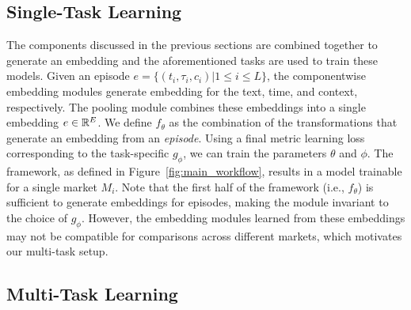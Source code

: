 \subsection{Single-Task Learning}
The components discussed in the previous sections are combined together to generate  an embedding and the aforementioned tasks are used to train these models. 
Given an episode $e = \{(t_i, \tau_i, c_i) | 1 \leq i \leq L\}$, the componentwise embedding modules generate embedding for the text, time, and context, respectively.
The pooling module combines these embeddings into a single embedding $e \in \mathbb{R}^E$. 
We define $f_\theta$ as the combination of the transformations that generate an embedding from an \textit{episode}.
Using a final metric learning loss corresponding to the task-specific $g_\phi$, we can train the parameters $\theta$ and $\phi$.
The framework, as defined in Figure~\ref{fig:main_workflow}, results in a model trainable for a single market $M_i$. 
Note that the first half of the framework (i.e., $f_\theta$) is sufficient to generate embeddings for episodes, making the module invariant to the choice of $g_\phi$. 
However, the embedding modules learned from these embeddings may not be compatible for comparisons across different markets, which motivates our multi-task setup. 

\subsection{Multi-Task Learning}


